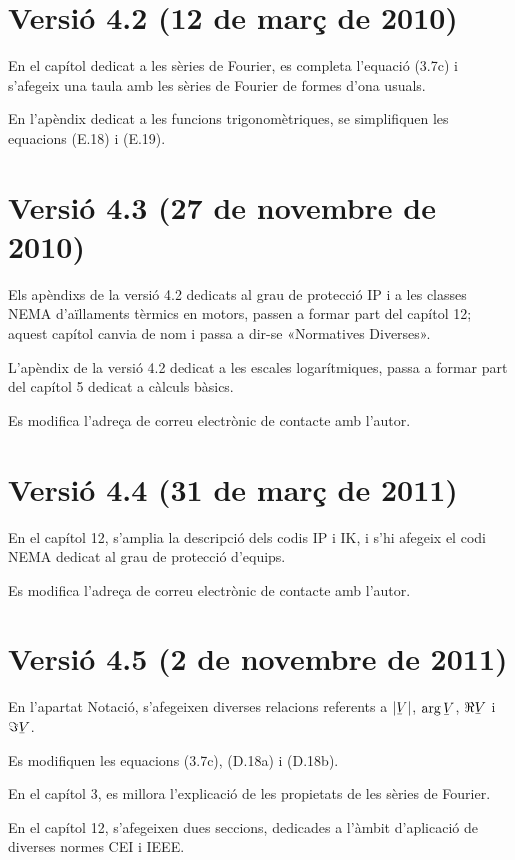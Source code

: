 \section*{Versió 4.2 (12 de març de 2010)}
En el capítol dedicat a les sèries de Fourier, es completa l'equació (3.7c) i s'afegeix una taula amb les sèries de Fourier de formes d'ona usuals.

En l'apèndix dedicat a les funcions trigonomètriques, se simplifiquen les equacions (E.18) i (E.19).

\section*{Versió 4.3 (27 de novembre de 2010)}
Els apèndixs de la versió 4.2 dedicats al grau de protecció IP i  a les classes NEMA d'aïllaments tèrmics en motors, passen a formar part del capítol 12; aquest capítol canvia de nom i passa a dir-se «Normatives Diverses».

L'apèndix de la versió 4.2 dedicat a les escales logarítmiques, passa a formar part del capítol 5 dedicat a càlculs bàsics.

Es modifica l'adreça de correu electrònic de contacte amb l'autor.

\section*{Versió 4.4 (31 de març de 2011)}
En el capítol 12, s'amplia la descripció dels codis IP i IK, i s'hi afegeix el codi NEMA dedicat al grau de protecció d'equips.

Es modifica l'adreça de correu electrònic de contacte amb l'autor.

\section*{Versió 4.5 (2 de novembre de 2011)}
En l'apartat Notació, s'afegeixen diverses relacions referents a $|\cmplx{V}|$, $\arg\cmplx{V}$, $\Re\cmplx{V}$ i $\Im\cmplx{V}$.

Es modifiquen les equacions (3.7c), (D.18a) i (D.18b).

En el capítol 3, es millora l'explicació de les propietats de les sèries de Fourier.

En el capítol 12, s'afegeixen dues seccions, dedicades a l'àmbit d'aplicació de diverses normes CEI i IEEE.

